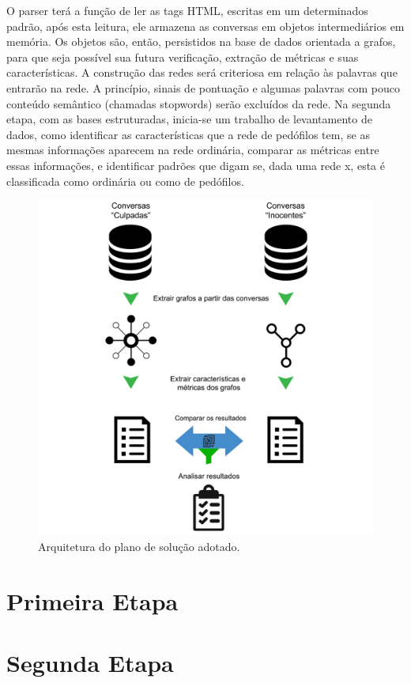 \documentclass[xindy,rascunho]{fei}
\begin{document}
O parser terá a função de ler as tags HTML, escritas em um determinados padrão, após esta leitura, ele armazena as conversas em objetos intermediários em memória. Os objetos são, então, persistidos na base de dados orientada a grafos, para que seja possível sua futura verificação, extração de métricas e suas características.
A construção das redes será criteriosa em relação às palavras que entrarão na rede. A princípio, sinais de pontuação e algumas palavras com pouco conteúdo semântico (chamadas stopwords) serão excluídos da rede.
Na segunda etapa, com as bases estruturadas, inicia-se um trabalho de levantamento de dados, como identificar as características que a rede de pedófilos tem, se as mesmas informações aparecem na rede ordinária, comparar as métricas entre essas informações, e identificar padrões que digam se, dada uma rede x, esta é classificada como ordinária ou como de pedófilos.

\begin{figure}
\centering
\includegraphics[width=0.7\linewidth]{./Imagens_Monografia/ExplicacaoEstrategiaInicial.jpg}
\caption{Arquitetura do plano de solução adotado.}
\label{fig:Estrategia}
\end{figure}

\section{Primeira Etapa}

\section{Segunda Etapa}




\end{document}
